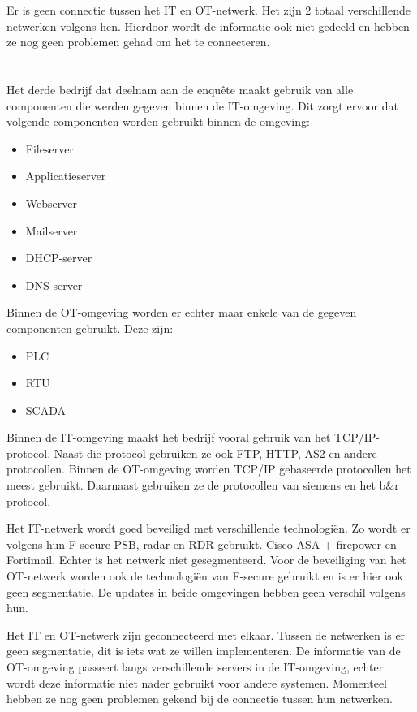 Er is geen connectie tussen het IT en OT-netwerk. Het zijn 2 totaal verschillende netwerken volgens hen. Hierdoor wordt de informatie ook niet gedeeld en hebben ze nog geen problemen gehad om het te connecteren.

\section{}
\label{sec:Bedrijf 3}
Het derde bedrijf dat deelnam aan de enquête maakt gebruik van alle componenten die werden gegeven binnen de IT-omgeving. Dit zorgt ervoor dat volgende componenten worden gebruikt binnen de omgeving:
\begin{itemize}
    \item Fileserver
    \item Applicatieserver
    \item Webserver
    \item Mailserver
    \item DHCP-server
    \item DNS-server
\end{itemize}
Binnen de OT-omgeving worden er echter maar enkele van de gegeven componenten gebruikt. Deze zijn:
\begin{itemize}
    \item PLC
    \item RTU
    \item SCADA
\end{itemize}

Binnen de IT-omgeving maakt het bedrijf vooral gebruik van het TCP/IP-protocol. Naast die protocol gebruiken ze ook FTP, HTTP, AS2 en andere protocollen. Binnen de OT-omgeving worden TCP/IP gebaseerde protocollen het meest gebruikt. Daarnaast gebruiken ze de protocollen van siemens en het b\&r protocol.

Het IT-netwerk wordt goed beveiligd met verschillende technologiën. Zo wordt er volgens hun F-secure PSB, radar en RDR gebruikt. Cisco ASA + firepower en Fortimail. Echter is het netwerk niet gesegmenteerd. Voor de beveiliging van het OT-netwerk worden ook de technologiën van F-secure gebruikt en is er hier ook geen segmentatie. De updates in beide omgevingen hebben geen verschil volgens hun. 

Het IT en OT-netwerk zijn geconnecteerd met elkaar. Tussen de netwerken is er geen segmentatie, dit is iets wat ze willen implementeren. De informatie van de OT-omgeving passeert langs verschillende servers in de IT-omgeving, echter wordt deze informatie niet nader gebruikt voor andere systemen. Momenteel hebben ze nog geen problemen gekend bij de connectie tussen hun netwerken.

